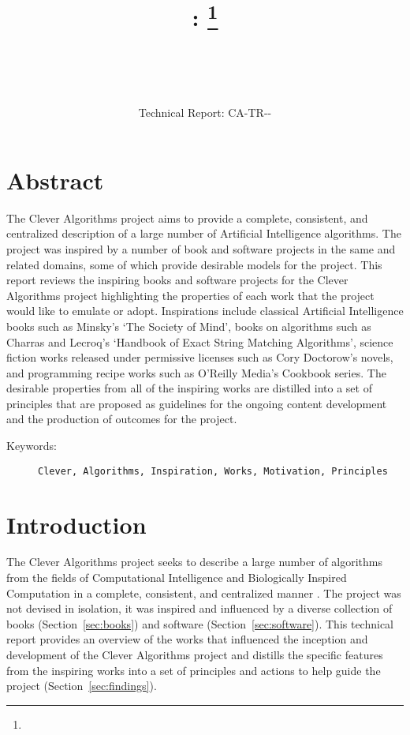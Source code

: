 \documentclass[a4paper, 11pt]{article}
\title{{\myreporttitle}: {\myreportsubtitle}\footnote{\myreportlicense}}
\author{\myreportauthor\\{\myreportemail}\\\small\myreportproject}
\date{\myreportfulldate\\{\small{Technical Report: CA-TR-{\myreportdate}-\myreportversion}}}
\begin{document}
\maketitle

\section*{Abstract} 
The Clever Algorithms project aims to provide a complete, consistent, and centralized description of a large number of Artificial Intelligence algorithms.
The project was inspired by a number of book and software projects in the same and related domains, some of which provide desirable models for the project. This report reviews the inspiring books and software projects for the Clever Algorithms project highlighting the properties of each work that the project would like to emulate or adopt.
Inspirations include classical Artificial Intelligence books such as Minsky's `The Society of Mind', books on algorithms such as Charras and Lecroq's `Handbook of Exact String Matching Algorithms', science fiction works released under permissive licenses such as Cory Doctorow's novels, and programming recipe works such as O'Reilly Media's Cookbook series. 
The desirable properties from all of the inspiring works are distilled into a set of principles that are proposed as guidelines for the ongoing content development and the production of outcomes for the project.

\begin{description}
	\item[Keywords:] {\small\texttt{Clever, Algorithms, Inspiration, Works, Motivation, Principles}}
\end{description} 

\section{Introduction}
\label{sec:introduction}
The Clever Algorithms project seeks to describe a large number of algorithms from the fields of Computational Intelligence and Biologically Inspired Computation in a complete, consistent, and centralized manner \cite{Brownlee2010}. The project was not devised in isolation, it was inspired and influenced by a diverse collection of books (Section~\ref{sec:books}) and software (Section~\ref{sec:software}). This technical report provides an overview of the works that influenced the inception and development of the Clever Algorithms project and distills the specific features from the inspiring works into a set of principles and actions to help guide the project (Section~\ref{sec:findings}).
\end{document}

